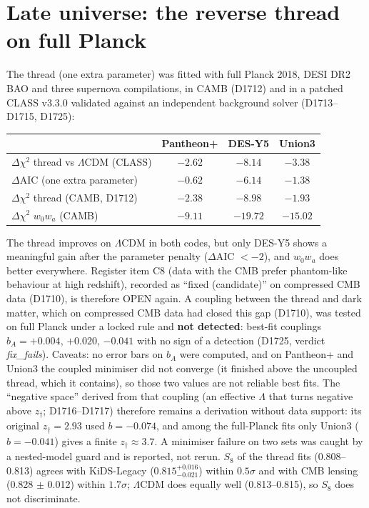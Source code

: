 \documentclass[11pt]{article}
\begin{document}
\section{Late universe: the reverse thread on full Planck}
The thread (one extra parameter) was fitted with full Planck 2018, DESI DR2 BAO and three supernova compilations, in CAMB (D1712) and in a patched CLASS v3.3.0 validated against an independent background solver (D1713--D1715, D1725):
\begin{center}\small
\begin{tabular}{lccc}\toprule
 & Pantheon+ & DES-Y5 & Union3\\\midrule
$\Delta\chi^2$ thread vs $\Lambda$CDM (CLASS) & $-2.62$ & $-8.14$ & $-3.38$\\
$\Delta$AIC (one extra parameter) & $-0.62$ & $-6.14$ & $-1.38$\\
$\Delta\chi^2$ thread (CAMB, D1712) & $-2.38$ & $-8.98$ & $-1.93$\\
$\Delta\chi^2$ $w_0w_a$ (CAMB) & $-9.11$ & $-19.72$ & $-15.02$\\\bottomrule
\end{tabular}
\end{center}
The thread improves on $\Lambda$CDM in both codes, but only DES-Y5 shows a meaningful gain after the parameter penalty ($\Delta$AIC $<-2$), and $w_0w_a$ does better everywhere. Register item C8 (data with the CMB prefer phantom-like behaviour at high redshift), recorded as ``fixed (candidate)'' on compressed CMB data (D1710), is therefore OPEN again. A coupling between the thread and dark matter, which on compressed CMB data had closed this gap (D1710), was tested on full Planck under a locked rule and \textbf{not detected}: best-fit couplings $b_A=+0.004$, $+0.020$, $-0.041$ with no sign of a detection (D1725, verdict \emph{fix\_fails}). Caveats: no error bars on $b_A$ were computed, and on Pantheon+ and Union3 the coupled minimiser did not converge (it finished above the uncoupled thread, which it contains), so those two values are not reliable best fits. The ``negative space'' derived from that coupling (an effective $\Lambda$ that turns negative above $z_\dagger$; D1716--D1717) therefore remains a derivation without data support: its original $z_\dagger=2.93$ used $b=-0.074$, and among the full-Planck fits only Union3 ($b=-0.041$) gives a finite $z_\dagger\approx3.7$. A minimiser failure on two sets was caught by a nested-model guard and is reported, not rerun. $S_8$ of the thread fits (0.808--0.813) agrees with KiDS-Legacy ($0.815^{+0.016}_{-0.021}$) within $0.5\sigma$ and with CMB lensing (0.828 $\pm$ 0.012) within $1.7\sigma$; $\Lambda$CDM does equally well (0.813--0.815), so $S_8$ does not discriminate.
\end{document}
